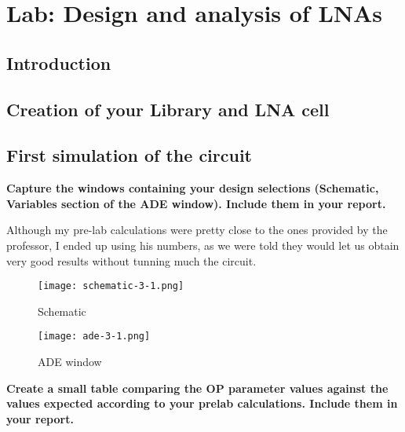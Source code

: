 






\chapter{Lab: Design and analysis of LNAs}

\section{Introduction}

\section{Creation of your Library and LNA cell}


\section{First simulation of the circuit}
\begin{pexbox}{}
   \noindent \textbf{Capture the windows containing your design selections (Schematic, Variables section of the ADE window). Include them in your report.}
\end{pexbox}

\noindent Although my pre-lab calculations were pretty close to the ones provided by the professor, I ended up using his numbers, as we were told they would let us obtain very good results without tunning much the circuit.
\begin{figure} [H] \centering
   \texttt{[image: schematic-3-1.png]}
   \caption{Schematic}
\end{figure}

\begin{figure} [H] \centering
   \texttt{[image: ade-3-1.png]}
   \caption{ADE window}
\end{figure}




\begin{pexbox}{}
   \noindent \textbf{Create a small table comparing the OP parameter values against the values expected according to your prelab calculations. Include them in your report.}
\end{pexbox}

